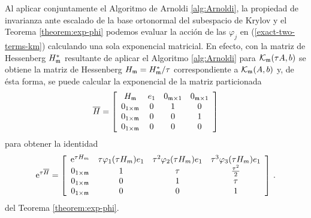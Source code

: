 Al aplicar conjuntamente el Algoritmo de Arnoldi \ref{alg:Arnoldi}, la propiedad de invarianza ante escalado de la base ortonormal del subespacio de Krylov y el Teorema \ref{theorem:exp-phi} podemos evaluar la acción de las $\varphi_j$ en (\ref{exact-two-terms-km}) calculando una sola exponencial matricial. En efecto, con la matriz de Hessenberg $H^*_{\mathfrak{m}}$ resultante de aplicar el Algoritmo \ref{alg:Arnoldi} para $\mathcal{K}_{\mathfrak{m}}(\tau A,b)$ se obtiene la matriz de Hessenberg $H_{\mathfrak{m}}=H^*_{\mathfrak{m}}/\tau$ correspondiente a $\mathcal{K}_{\mathfrak{m}}(A,b)$ y, de ésta forma, se puede calcular la exponencial de la matriz particionada
\begin{equation}
    \overline{H} = \left[\begin{array}{cccc}
    H_{\mathfrak{m}} & e_1 & 0_{\mathfrak{m}\times 1} & 0_{\mathfrak{m}\times 1}\\
    0_{1\times\mathfrak{m}} & 0 & 1 & 0\\
    0_{1\times\mathfrak{m}} & 0 & 0 & 1\\
    0_{1\times\mathfrak{m}} & 0 & 0 & 0
    \end{array}\right] \label{hhat_hessenberg_matrix}
    \end{equation}
para obtener la identidad
\begin{equation}
    \mathrm{e}^{\tau\overline{H}} = \left[\begin{array}{cccc}
    \mathrm{e}^{\tau H_m} & \tau\varphi_1(\tau H_m)e_1 & \tau^{2}\varphi_2(\tau H_m)e_1 &
    \tau^{3}\varphi_3(\tau H_m)e_1 \\
    \textcolor{black}{0_{1\times\mathfrak{m}}} & 1 & \tau & \frac{\tau^{2}}{2}\\
    \textcolor{black}{0_{1\times\mathfrak{m}}} & 0 & 1 & \tau \\
    \textcolor{black}{0_{1\times\mathfrak{m}}} & 0 & 0 & 1 \\
    \end{array}\right] \,. \label{phi_hhat_exponential}
\end{equation}
del Teorema \ref{theorem:exp-phi}.


